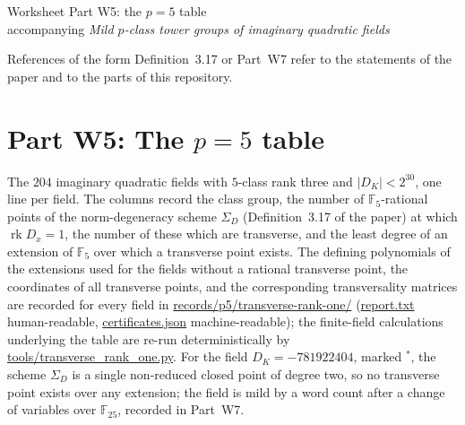 \documentclass[11pt]{article}
\newcommand{\Ffive}{\mathbb F_5}
\newcommand{\rk}{\operatorname{rk}}
\providecommand{\nolinkurl}[1]{\url{#1}}
\begin{document}
\begin{center}
{\Large Worksheet Part W5: the $p=5$ table}\\[2mm]
accompanying \emph{Mild $p$-class tower groups of imaginary quadratic
fields}
\end{center}

\medskip
\noindent
References of the form Definition~3.17 or Part~W7 refer to the
statements of the paper and to the parts of this repository.

\section*{Part W5: The $p=5$ table}

The $204$ imaginary quadratic fields with $5$-class rank three and
$|D_K|<2^{30}$, one line per field.  The columns record the class
group, the number of $\Ffive$-rational points of the norm-degeneracy
scheme $\Sigma_D$ (Definition~3.17 of the paper) at which
$\rk D_x=1$, the number of these which are transverse, and the least
degree of an extension of $\Ffive$ over which a transverse point
exists.  The defining polynomials of the extensions used for the
fields without a rational transverse point, the coordinates of all
transverse points, and the corresponding transversality matrices are
recorded for every field in
\nolinkurl{records/p5/transverse-rank-one/}
(\nolinkurl{report.txt} human-readable,
\nolinkurl{certificates.json} machine-readable); the finite-field
calculations underlying the table are re-run deterministically by
\nolinkurl{tools/transverse_rank_one.py}.  For the field
$D_K=-781922404$, marked ${}^{*}$, the scheme $\Sigma_D$ is a single
non-reduced closed point of degree two, so no transverse point exists
over any extension; the field is mild by a word count after a change
of variables over $\mathbb F_{25}$, recorded in Part~W7.
\end{document}
